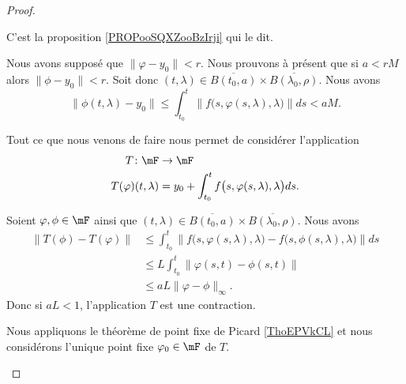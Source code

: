\begin{proof}
\begin{subproof}
		C'est la proposition \ref{PROPooSQXZooBzIrji} qui le dit.

		Nous avons supposé que \( \| \varphi-y_0 \|<r\). Nous prouvons à présent que si \( a<rM\) alors \( \| \phi-y_0 \|<r\). Soit donc \( (t,\lambda)\in \overline{B(t_0,a)}\times \overline{B(\lambda_0,\rho)}\). Nous avons
		\begin{equation}
			\| \phi(t,\lambda)-y_0 \|\leq\int_{t_0}^t\| f\big( s,\varphi(s,\lambda),\lambda \big) \|ds<aM.
		\end{equation}

		\spitem[L'application \( T\)]
		Tout ce que nous venons de faire nous permet de considérer l'application
		\begin{equation}
			\begin{aligned}
				T\colon \mF           & \to \mF                                                        \\
				T(\varphi)(t,\lambda) & = y_0+\int_{t_0}^tf\big( s,\varphi(s,\lambda),\lambda \big)ds.
			\end{aligned}
		\end{equation}

		Soient \( \varphi,\phi\in\mF\) ainsi que \( (t,\lambda)\in\overline{B(t_0,a)}\times\overline{B(\lambda_0,\rho)}\). Nous avons
		\begin{subequations}
			\begin{align}
				\| T(\phi)-T(\varphi) \| & \leq \int_{t_0}^t\| f\big( s,\varphi(s,\lambda),\lambda \big)-f\big( s,\phi(s,\lambda),\lambda \big) \|ds \\
				                         & \leq L\int_{t_0}^t\| \varphi(s,t)-\phi(s,t) \|                                                            \\
				                         & \leq aL \| \varphi-\phi \|_{\infty}.
			\end{align}
		\end{subequations}
		Donc si \( aL<1\), l'application \( T\) est une contraction.

		\spitem[Picard]
		Nous appliquons le théorème de point fixe de Picard \ref{ThoEPVkCL} et nous considérons l'unique point fixe \( \varphi_0\in\mF\) de \( T\).


\end{subproof}
\end{proof}
